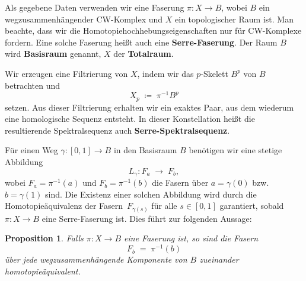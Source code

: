 \documentclass[12pt]{article}
\numberwithin{conj}{section}
\newtheorem{proposition}[conj]{Proposition}
\begin{document}
    Als gegebene Daten verwenden wir eine Faserung $\pi : X \to B$, wobei $B$ ein
    wegzusammenhängender CW-Komplex und $X$ ein topologischer Raum ist. Man beachte,
    dass wir die Homotopiehochhebungseigenschaften nur für CW-Komplexe fordern. Eine
    solche Faserung heißt auch eine \textbf{Serre-Faserung}. Der Raum $B$ wird \textbf{Basisraum}
    genannt, $X$ der \textbf{Totalraum}.

    Wir erzeugen eine Filtrierung von $X$, indem wir das $p$-Skelett $B^{p}$ von $B$
    betrachten und
    \[
        X_{p} \;\coloneqq\; \pi^{-1} B^{p} 
    \]
    setzen. Aus dieser Filtrierung erhalten wir ein exaktes Paar, aus dem wiederum
    eine homologische Sequenz entsteht. In dieser Konstellation heißt die
    resultierende Spektralsequenz auch \textbf{Serre-Spektralsequenz}.

    \smallskip

    Für einen Weg $\gamma: [0,1] \to B$ in den Basisraum $B$ benötigen wir eine
    stetige Abbildung
    \[
        L_{\gamma} : F_{a} \;\longrightarrow\; F_{b},
    \]
    wobei $F_{a} = \pi^{-1}(a)$ und $F_{b} = \pi^{-1}(b)$ die Fasern über
    $a = \gamma(0)$ bzw.\ $b = \gamma(1)$ sind. Die Existenz einer solchen
    Abbildung wird durch die Homotopieäquivalenz der Fasern $\,F_{\gamma(s)}$ für
    alle $s\in[0,1]$ garantiert, sobald $\pi : X \to B$ eine Serre-Faserung ist.
    Dies führt zur folgenden Aussage:

    \begin{proposition}
        Falls $\pi : X \to B$ eine Faserung ist, so sind die Fasern
        \[
            F_{b} \;=\; \pi^{-1}(b)
        \]
        über jede wegzusammenhängende Komponente von $B$ zueinander
        homotopieäquivalent.
    \end{proposition}
\end{document}
